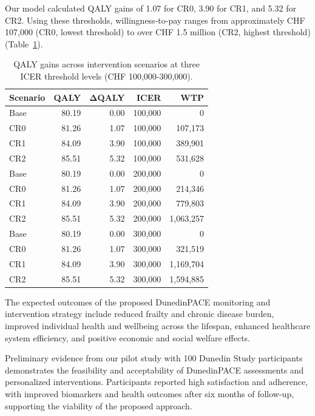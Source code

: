 Our model calculated QALY gains of 1.07 for CR0, 3.90 for CR1, and 5.32 for CR2. Using these thresholds, willingness-to-pay ranges from approximately CHF 107,000 (CR0, lowest threshold) to over CHF 1.5 million (CR2, highest threshold) (Table~\ref{tab:qaly}).

\begin{table}[h]
\centering
\small
\setlength{\tabcolsep}{3pt}
\begin{tabular}{lrrrr}
\toprule
\textbf{Scenario} & \textbf{QALY} & \textbf{$\mathbf{\Delta}$QALY} & \textbf{ICER} & \textbf{WTP} \\
\midrule
Base & 80.19 & 0.00 & 100,000 & 0 \\
CR0 & 81.26 & 1.07 & 100,000 & 107,173 \\
CR1 & 84.09 & 3.90 & 100,000 & 389,901 \\
CR2 & 85.51 & 5.32 & 100,000 & 531,628 \\
\midrule
Base & 80.19 & 0.00 & 200,000 & 0 \\
CR0 & 81.26 & 1.07 & 200,000 & 214,346 \\
CR1 & 84.09 & 3.90 & 200,000 & 779,803 \\
CR2 & 85.51 & 5.32 & 200,000 & 1,063,257 \\
\midrule
Base & 80.19 & 0.00 & 300,000 & 0 \\
CR0 & 81.26 & 1.07 & 300,000 & 321,519 \\
CR1 & 84.09 & 3.90 & 300,000 & 1,169,704 \\
CR2 & 85.51 & 5.32 & 300,000 & 1,594,885 \\
\bottomrule
\end{tabular}
\caption{QALY gains across intervention scenarios at three ICER threshold levels (CHF 100,000-300,000).}
\label{tab:qaly}
\end{table}

The expected outcomes of the proposed DunedinPACE monitoring and intervention strategy include reduced frailty and chronic disease burden, improved individual health and wellbeing across the lifespan, enhanced healthcare system efficiency, and positive economic and social welfare effects.

Preliminary evidence from our pilot study with 100 Dunedin Study participants demonstrates the feasibility and acceptability of DunedinPACE assessments and personalized interventions. Participants reported high satisfaction and adherence, with improved biomarkers and health outcomes after six months of follow-up, supporting the viability of the proposed approach.
